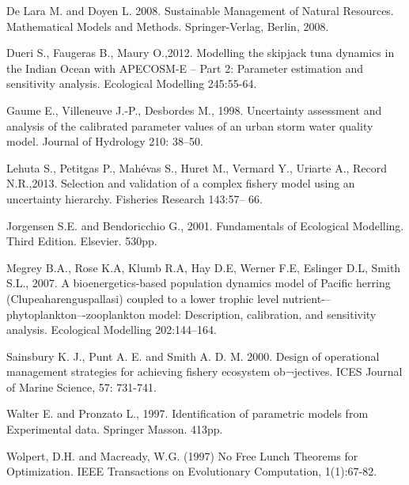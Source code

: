 De Lara M. and Doyen L. 2008. Sustainable Management of Natural Resources. Mathematical Models and Methods. Springer-Verlag, Berlin, 2008.

Dueri S., Faugeras  B., Maury O.,2012. Modelling the skipjack tuna dynamics in the Indian Ocean with APECOSM-E – Part 2: Parameter estimation and sensitivity analysis. Ecological Modelling 245:55-64.

Gaume E., Villeneuve J.-P., Desbordes M., 1998. Uncertainty assessment and analysis of the calibrated parameter values of an urban storm water quality model. Journal of Hydrology 210: 38–50.

Lehuta S., Petitgas P., Mahévas S., Huret M., Vermard Y., Uriarte A.,  Record N.R.,2013. Selection  and  validation  of  a  complex  fishery  model  using  an  uncertainty hierarchy. Fisheries Research  143:57–  66.

Jorgensen S.E. and Bendoricchio G., 2001. Fundamentals of Ecological Modelling. Third Edition. Elsevier. 530pp.

Megrey B.A., Rose K.A, Klumb R.A, Hay D.E, Werner F.E, Eslinger D.L, Smith S.L., 2007. A bioenergetics-based population dynamics model of Pacific herring (Clupeaharenguspallasi) coupled to a lower trophic level nutrient-–phyto\-plankton–-zoo\-plankton model: Description, calibration, and sensitivity analysis. Ecological Modelling 202:144–164.

Sainsbury K. J., Punt A. E. and Smith A. D. M. 2000. Design of operational management strategies for achieving fishery ecosystem ob¬jectives. ICES Journal of Marine Science, 57: 731-741.

Walter E. and Pronzato L., 1997. Identification of parametric models from Experimental data. Springer Masson. 413pp.

Wolpert, D.H. and Macready, W.G. (1997) No Free Lunch Theorems for Optimization. IEEE Transactions on Evolutionary Computation, 1(1):67-82.


